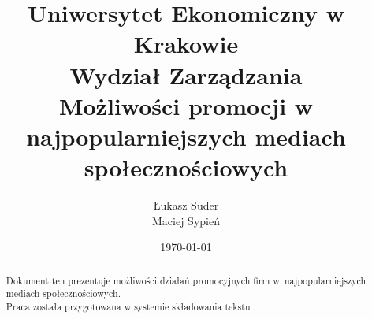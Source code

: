 \documentclass[12pt, oneside, a4paper]{article}
\title{
	\LARGE{Uniwersytet Ekonomiczny w Krakowie}\\
	\vspace{0,3cm}
	\Large{Wydział Zarządzania}\\
	\vspace{3cm}
	\Huge{Możliwości promocji w najpopularniejszych mediach społecznościowych}
	\vspace{2cm}
}
\author{Łukasz Suder\\ Maciej Sypień}
\date{\today}
\theoremstyle{plain}
\theoremstyle{definition}
\theoremstyle{remark}
\begin{document}
\nocite{*}     %

\maketitle     %

\begin{abstract}
Dokument ten prezentuje możliwości działań promocyjnych firm w~najpopularniejszych mediach społecznościowych.\\
Praca została przygotowana w systemie składowania tekstu \LaTeXe .
\end{abstract}

\clearpage
\tableofcontents     %
\clearpage








\printbibliography
\end{document}
